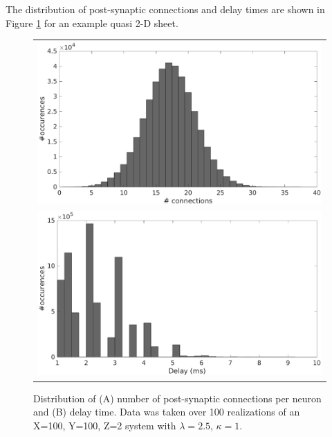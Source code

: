 The distribution of post-synaptic connections and delay times are shown in Figure \ref{fig:connection_delay_distrbution_2D} for an example quasi 2-D sheet.
\begin{figure}[!htb]
 \caption{Distribution of (A) number of post-synaptic connections per neuron and (B) delay time. Data was taken over 100 realizations of an X=100, Y=100, Z=2 system with $\lambda=2.5$, $\kappa=1$.  } 
 \begin{tabular}{c}
     \includegraphics[width=\textwidth]{fig/ConnectionNumberDistribution2D} \\
     \includegraphics[width=\textwidth]{fig/DelayDistribution2D} 
 \end{tabular}
 \label{fig:connection_delay_distrbution_2D}
\end{figure}
 \FloatBarrier


